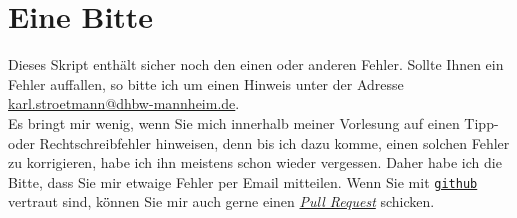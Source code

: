 \section{Eine Bitte}
Dieses Skript enth\"alt sicher noch den einen oder anderen Fehler.  Sollte Ihnen ein Fehler auffallen, so bitte ich
um einen Hinweis unter der Adresse
\\[0.2cm]
\hspace*{1.3cm}
\href{mailto:karl.stroetmann@dhbw-mannheim.de}{karl.stroetmann@dhbw-mannheim.de}.
\\[0.2cm]
Es bringt mir wenig, wenn Sie mich innerhalb meiner Vorlesung auf einen Tipp- oder
Rechtschreibfehler hinweisen, denn bis ich dazu komme, einen solchen Fehler zu korrigieren, habe ich
ihn meistens schon wieder vergessen.  Daher habe ich die Bitte, dass Sie mir etwaige Fehler per Email mitteilen.
Wenn Sie mit \href{http://github.com}{\texttt{github}} vertraut sind, k\"önnen Sie mir auch gerne einen
\href{https://help.github.com/articles/using-pull-requests}{\textsl{Pull Request}} schicken.


